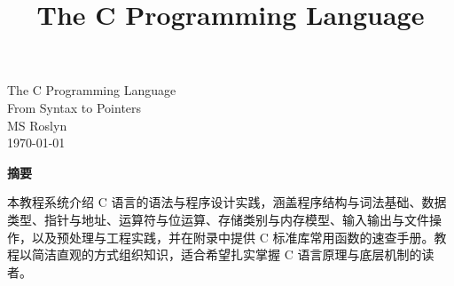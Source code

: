 \documentclass[12pt,a4paper]{ctexrep}
\title{\textbf{\huge The C Programming Language}}
\author{}
\date{}
\begin{document}
\clearpage
\thispagestyle{empty}
\vspace*{\fill}

\begin{center}
{\huge The C Programming Language}\\[0.8em]
{\large From Syntax to Pointers}\\[2.5em]
{\large MS Roslyn}\\[0.6em]
{\large \today}
\end{center}

\vspace{2.5em}

\begin{center}
{\bfseries 摘要}
\end{center}

\vspace{1em}

\begin{center}
本教程系统介绍 C 语言的语法与程序设计实践，涵盖程序结构与词法基础、数据类型、指针与地址、运算符与位运算、存储类别与内存模型、输入输出与文件操作，以及预处理与工程实践，并在附录中提供 C 标准库常用函数的速查手册。教程以简洁直观的方式组织知识，适合希望扎实掌握 C 语言原理与底层机制的读者。
\end{center}

\vspace*{\fill}
\clearpage

\tableofcontents
\newpage

\pagestyle{fancy}
\fancyhf{}

\clearpage

\clearpage

\clearpage

\clearpage

\clearpage

\clearpage

\clearpage

\clearpage

\clearpage
\appendix

\clearpage

\clearpage

\end{document}

